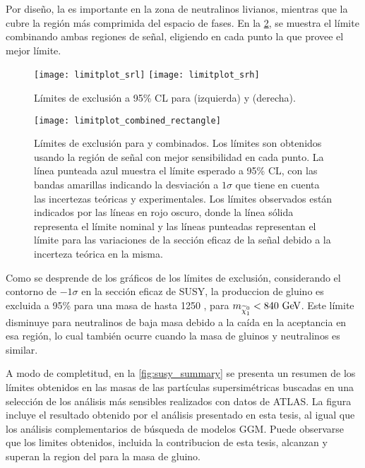 Por diseño, la {\SRL} es importante en la zona de neutralinos livianos, mientras que
la {\SRH} cubre la región más comprimida del espacio de fases. En la
\cref{fig:limit_combined}, se muestra el límite combinando ambas
regiones de señal, eligiendo en cada punto la que provee el mejor límite.


\begin{figure}[!htb]
  \centering

  \texttt{[image: limitplot\_srl]}
  \texttt{[image: limitplot\_srh]}

  \caption{Límites de exclusión a 95\% CL para {\SRL}  (izquierda) y {\SRH} (derecha).}
  \label{fig:limit_srs}
\end{figure}


\begin{figure}[!htb]
  \centering

  \texttt{[image: limitplot\_combined\_rectangle]}

  \caption{Límites de exclusión para {\SRL} y {\SRH} combinados. Los límites
    son obtenidos usando la región de señal con mejor sensibilidad en cada punto.
    La línea punteada azul muestra el límite esperado a 95\% CL, con las bandas
    amarillas indicando la desviación a $1\sigma$ que tiene en cuenta las incertezas
    teóricas y experimentales. Los
    límites observados están indicados por las líneas en rojo oscuro, donde la línea
    sólida representa el límite nominal y las líneas punteadas representan el límite
    para las variaciones de la sección eficaz de la señal debido a la incerteza
    teórica en la misma.}
   \label{fig:limit_combined}

\end{figure}


Como se desprende de los gráficos de los límites de exclusión, considerando el
contorno de $-1\sigma$ en la sección eficaz de SUSY, la produccion de gluino es
excluida a 95\% {\cl} para una masa de hasta 1250 \gev, para
$m_{\ninoone}<{840}\gev$. Este límite disminuye para neutralinos de baja masa
debido a la caída en la aceptancia en esa región, lo cual también ocurre cuando
la masa de gluinos y neutralinos es similar.

A modo de completitud, en la \cref{fig:susy_summary} se presenta un resumen de
los límites obtenidos en las masas de las partículas supersimétricas buscadas en
una selección de los análisis más sensibles realizados con datos de ATLAS. La
figura incluye el resultado obtenido por el análisis presentado en esta tesis,
al igual que los análisis complementarios de búsqueda de modelos GGM.
Puede observarse que los limites obtenidos, incluida la contribucion de esta tesis,
alcanzan y superan la region del {\tev} para la masa de gluino.

